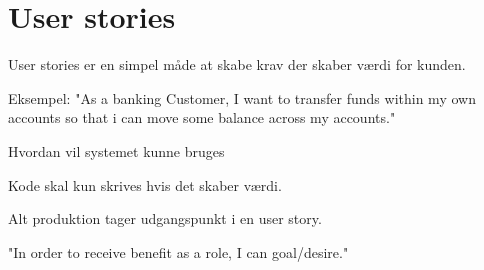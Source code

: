 \section{User stories}

User stories er en simpel måde at skabe krav der skaber værdi for kunden.

Eksempel: "As a banking Customer, I want to transfer funds within my own accounts so that i can
move some balance across my accounts."

Hvordan vil systemet kunne bruges

Kode skal kun skrives hvis det skaber værdi.

Alt produktion tager udgangspunkt i en user story.

"In order to receive benefit as a role, I can goal/desire."
